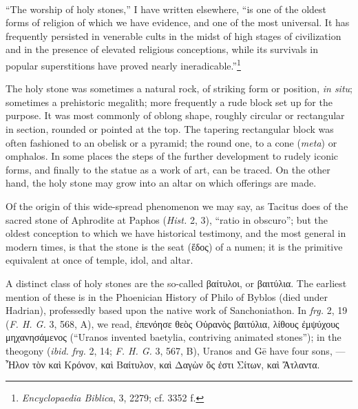 \documentclass[a4paper, 12pt, oneside, polutonikogreek, english]{article}
\begin{document}
\paragraph{}
``The worship of holy stones,'' I have written elsewhere, ``is one of the oldest forms of religion of which we have evidence, and one of the most universal. It has frequently persisted in venerable cults in the midst of high stages of civilization and in the presence of elevated religious conceptions, while its survivals in popular superstitions have proved nearly ineradicable.''\footnote{\emph{Encyclopaedia Biblica}, 3, 2279; cf. 3352 f.}

The holy stone was sometimes a natural rock, of striking form or position, \emph{in situ}; sometimes a prehistoric megalith; more frequently a rude block set up for the purpose. It was most commonly of oblong shape, roughly circular or rectangular in section, rounded or pointed at the top. The tapering rectangular block was often fashioned to an obelisk or a pyramid; the round one, to a cone (\emph{meta}) or omphalos. In some places the steps of the further development to rudely iconic forms, and finally to the statue as a work of art, can be traced. On the other hand, the holy stone may grow into an altar on which offerings are made.

Of the origin of this wide-spread phenomenon we may say, as Tacitus does of the sacred stone of Aphrodite at Paphos (\emph{Hist.} 2, 3), ``ratio in obscuro''; but the oldest conception to which we have historical testimony, and the most general in modern times, is that the stone is the seat (ἕδος) of a numen; it is the primitive equivalent at once of temple, idol, and altar.

A distinct class of holy stones are the so-called βαίτυλοι, or βαιτύλια. The earliest mention of these is in the Phoenician History of Philo of Byblos (died under Hadrian), professedly based upon the native work of Sanchoniathon. In \emph{frg.} 2, 19 (\emph{F. H. G.} 3, 568, A), we read, ἐπενόησε θεὸς Οὐρανὸς βαιτύλια, λίθους ἐμψύχους μηχανησάμενος (``Uranos invented baetylia, contriving animated stones''); in the theogony (\emph{ibid.} \emph{frg.} 2, 14; \emph{F. H. G.} 3, 567, B), Uranos and Gē have four sons, --- Ἦλον τὸν καὶ Κρόνον, καὶ Βαίτυλον, καὶ Δαγὼν ὅς ἐστι Σίτων, καὶ Ἄτλαντα.
\end{document}
